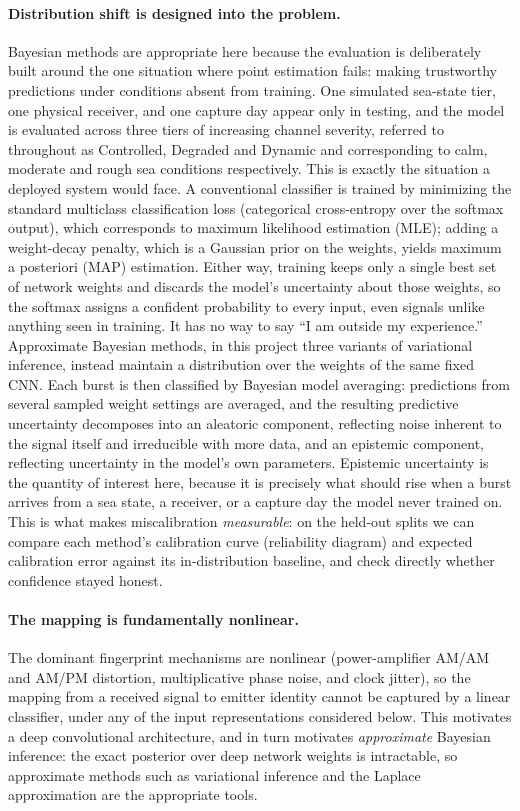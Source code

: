 \documentclass{article}
\begin{document}
\paragraph{Distribution shift is designed into the problem.}
Bayesian methods are appropriate here because the evaluation is deliberately built around
the one situation where point estimation fails: making trustworthy predictions under
conditions absent from training. One simulated sea-state tier, one physical receiver, and
one capture day appear only in testing, and the model is evaluated across three tiers of
increasing channel severity, referred to throughout as Controlled, Degraded and Dynamic
and corresponding to calm, moderate and rough sea conditions respectively. This is
exactly the situation a deployed system would face. A conventional classifier is trained by minimizing the
standard multiclass classification loss (categorical cross-entropy over the softmax
output), which corresponds to maximum likelihood estimation (MLE); adding a weight-decay
penalty, which is a Gaussian prior on the weights, yields maximum a posteriori (MAP)
estimation. Either way, training keeps only a single best set of network weights and
discards the model's uncertainty about those weights, so the softmax assigns a confident
probability to every input, even signals unlike anything seen in training. It has no way
to say ``I am outside my experience.'' Approximate Bayesian methods, in this project three
variants of variational inference, instead maintain a
distribution over the weights of the same fixed CNN. Each burst is then classified by
Bayesian model averaging: predictions from several sampled weight settings are averaged,
and the resulting predictive uncertainty decomposes into an aleatoric component,
reflecting noise inherent to the signal itself and irreducible with more data, and an
epistemic component, reflecting uncertainty in the model's own parameters. Epistemic
uncertainty is the quantity of interest here, because it is precisely what should rise
when a burst arrives from a sea state, a receiver, or a capture day the model never
trained on. This is what makes miscalibration \emph{measurable}: on the held-out splits
we can compare each method's calibration curve (reliability diagram) and expected
calibration error against its in-distribution baseline, and check directly whether
confidence stayed honest.

\paragraph{The mapping is fundamentally nonlinear.}
The dominant fingerprint mechanisms are nonlinear (power-amplifier AM/AM and AM/PM
distortion, multiplicative phase noise, and clock jitter), so the mapping from a received
signal to emitter identity cannot be captured by a linear classifier, under any of the
input representations considered below. This motivates a deep convolutional
architecture, and in turn motivates
\emph{approximate} Bayesian inference: the exact posterior over deep network weights is
intractable, so approximate methods such as variational inference and the Laplace
approximation are the appropriate tools.
\end{document}
